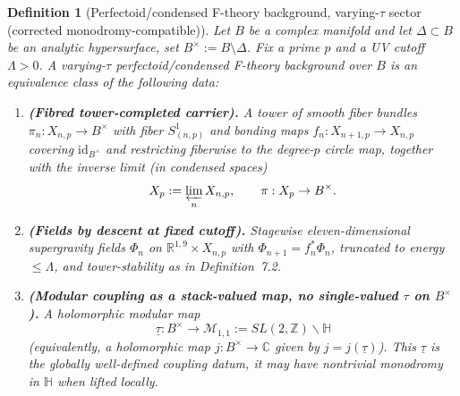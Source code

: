 \documentclass[11pt]{article}
\newtheorem{definition}[theorem]{Definition}
\theoremstyle{remark}
\begin{document}
\begin{definition}[Perfectoid/condensed F-theory background, varying-$\tau$ sector (corrected monodromy-compatible)] \label{def7.3}
Let $B$ be a complex manifold and let $\Delta\subset B$ be an analytic hypersurface, set $B^\times:=B\setminus\Delta$.
Fix a prime $p$ and a UV cutoff $\Lambda>0$.
A \emph{varying-$\tau$ perfectoid/condensed F-theory background over $B$} is an equivalence class of the following data:

\begin{enumerate}
\item \textbf{(Fibred tower-completed carrier).}
A tower of smooth fiber bundles $\pi_n:X_{n,p}\to B^\times$ with fiber $S^1_{(n,p)}$ and bonding maps
$f_n:X_{n+1,p}\to X_{n,p}$ covering $\mathrm{id}_{B^\times}$ and restricting fiberwise to the degree-$p$ circle map,
together with the inverse limit (in condensed spaces)
\begin{equation}
X_p:=\varprojlim_n X_{n,p},\qquad \pi:X_p\to B^\times.
\end{equation}

\item \textbf{(Fields by descent at fixed cutoff).}
Stagewise eleven-dimensional supergravity fields $\Phi_n$ on $\mathbb{R}^{1,9}\times X_{n,p}$ with $\Phi_{n+1}=f_n^*\Phi_n$,
truncated to energy $\le\Lambda$, and tower-stability as in Definition~7.2.

\item \textbf{(Modular coupling as a stack-valued map, no single-valued $\tau$ on $B^\times$).}
A holomorphic \emph{modular map}
\begin{equation}
\underline{\tau}:B^\times\longrightarrow \mathcal{M}_{1,1}:=SL(2,\mathbb{Z})\backslash\mathbb{H}
\end{equation}
(equivalently, a holomorphic map $j:B^\times\to\mathbb{C}$ given by $j=j(\underline{\tau})$).
This $\underline{\tau}$ is the globally well-defined coupling datum, it may have nontrivial monodromy in $\mathbb{H}$
when lifted locally.


\end{enumerate}
\end{definition}
\end{document}

